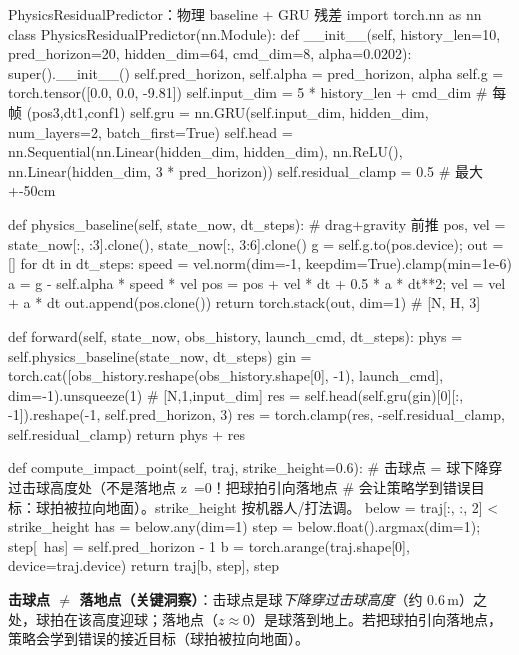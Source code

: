 \begin{codebox}[Python]{PhysicsResidualPredictor：物理 baseline + GRU 残差}
import torch.nn as nn
class PhysicsResidualPredictor(nn.Module):
    def __init__(self, history_len=10, pred_horizon=20, hidden_dim=64,
                 cmd_dim=8, alpha=0.0202):
        super().__init__()
        self.pred_horizon, self.alpha = pred_horizon, alpha
        self.g = torch.tensor([0.0, 0.0, -9.81])
        self.input_dim = 5 * history_len + cmd_dim          # 每帧 (pos3,dt1,conf1)
        self.gru = nn.GRU(self.input_dim, hidden_dim, num_layers=2, batch_first=True)
        self.head = nn.Sequential(nn.Linear(hidden_dim, hidden_dim), nn.ReLU(),
                                  nn.Linear(hidden_dim, 3 * pred_horizon))
        self.residual_clamp = 0.5                            # 最大 +-50cm

    def physics_baseline(self, state_now, dt_steps):        # drag+gravity 前推
        pos, vel = state_now[:, :3].clone(), state_now[:, 3:6].clone()
        g = self.g.to(pos.device); out = []
        for dt in dt_steps:
            speed = vel.norm(dim=-1, keepdim=True).clamp(min=1e-6)
            a = g - self.alpha * speed * vel
            pos = pos + vel * dt + 0.5 * a * dt**2; vel = vel + a * dt
            out.append(pos.clone())
        return torch.stack(out, dim=1)                       # [N, H, 3]

    def forward(self, state_now, obs_history, launch_cmd, dt_steps):
        phys = self.physics_baseline(state_now, dt_steps)
        gin = torch.cat([obs_history.reshape(obs_history.shape[0], -1),
                         launch_cmd], dim=-1).unsqueeze(1)    # [N,1,input_dim]
        res = self.head(self.gru(gin)[0][:, -1]).reshape(-1, self.pred_horizon, 3)
        res = torch.clamp(res, -self.residual_clamp, self.residual_clamp)
        return phys + res

    def compute_impact_point(self, traj, strike_height=0.6):
        # 击球点 = 球下降穿过击球高度处（不是落地点 z~=0！把球拍引向落地点
        # 会让策略学到错误目标：球拍被拉向地面）。strike_height 按机器人/打法调。
        below = traj[:, :, 2] < strike_height
        has = below.any(dim=1)
        step = below.float().argmax(dim=1); step[~has] = self.pred_horizon - 1
        b = torch.arange(traj.shape[0], device=traj.device)
        return traj[b, step], step
\end{codebox}

\textbf{击球点 $\neq$ 落地点（关键洞察）}：击球点是球\emph{下降穿过击球高度}（约 $0.6$\,m）之处，球拍在该高度迎球；落地点（$z\approx 0$）是球落到地上。若把球拍引向落地点，策略会学到错误的接近目标（球拍被拉向地面）。

